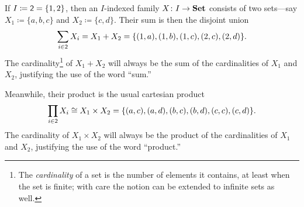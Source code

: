 \documentclass[Book-Poly]{subfiles}
\begin{document}
\begin{example}\label{ex.two_sums_and_prods}
    If $I\coloneqq\textsf{2}=\{1,2\}$, then an $I$-indexed family $X\colon I\to \mathbf{Set}$ consists of two sets---say $X_1\coloneqq\{a,b,c\}$ and $X_2\coloneqq\{c,d\}$.
    Their sum is then the disjoint union
    \[
    \sum_{i\in \textsf{2}}X_i=X_1+X_2=\{(1,a),(1,b),(1,c),(2,c),(2,d)\}.
    \]
    The cardinality\footnote{The \emph{cardinality} of a set is the number of elements it contains, at least when the set is finite; with care the notion can be extended to infinite sets as well.} of $X_1+X_2$ will always be the sum of the cardinalities of $X_1$ and $X_2$, justifying the use of the word ``sum.''

    Meanwhile, their product is the usual cartesian product
    \[\prod_{i\in \textsf{2}}X_i \cong X_1\times X_2=\{(a,c),(a,d),(b,c),(b,d),(c,c),(c,d)\}.\]
    The cardinality of $X_1\times X_2$ will always be the product of the cardinalities of $X_1$ and $X_2$, justifying the use of the word ``product.''
\end{example}
\end{document}
